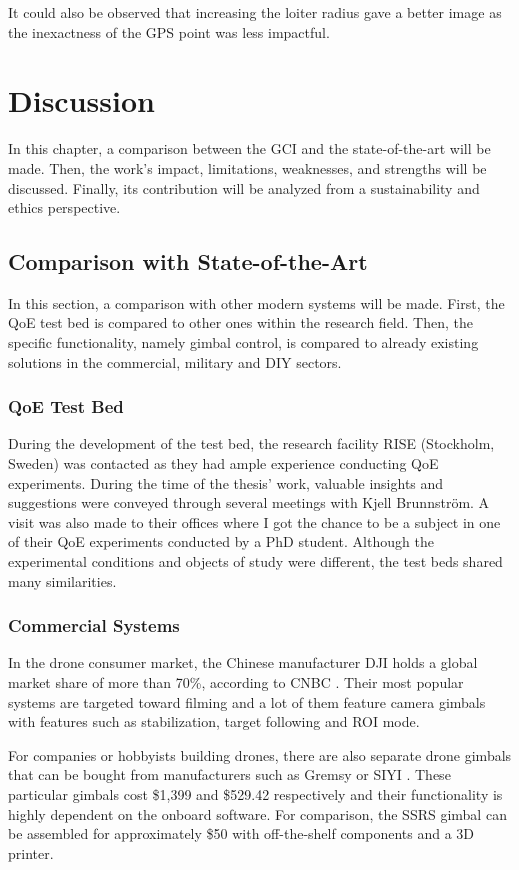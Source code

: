 \documentclass[nofilelist]{cslthse-msc}
\begin{document}
It could also be observed that increasing the loiter radius gave a better image as the inexactness of the GPS point was less impactful. 

\chapter{Discussion}
In this chapter, a comparison between the GCI and the state-of-the-art will be made. Then, the work's impact, limitations, weaknesses, and strengths will be discussed. Finally, its contribution will be analyzed from a sustainability and ethics perspective.

\section{Comparison with State-of-the-Art}
In this section, a comparison with other modern systems will be made. First, the QoE test bed is compared to other ones within the research field. Then, the specific functionality, namely gimbal control, is compared to already existing solutions in the commercial, military and DIY sectors.

\subsection{QoE Test Bed}
During the development of the test bed, the research facility RISE (Stockholm, Sweden) was contacted as they had ample experience conducting QoE experiments. During the time of the thesis' work, valuable insights and suggestions were conveyed through several meetings with Kjell Brunnström. A visit was also made to their offices where I got the chance to be a subject in one of their QoE experiments conducted by a PhD student. Although the experimental conditions and objects of study were different, the test beds shared many similarities. 

\subsection{Commercial Systems}
In the drone consumer market, the Chinese manufacturer DJI holds a global market share of more than 70\%, according to CNBC \cite{dji}. Their most popular systems are targeted toward filming and a lot of them feature camera gimbals with features such as stabilization, target following and ROI mode. 

For companies or hobbyists building drones, there are also separate drone gimbals that can be bought from manufacturers such as Gremsy \cite{gremsy} or SIYI \cite{siyi}. These particular gimbals cost \$1,399 and \$529.42 respectively and their functionality is highly dependent on the onboard software. For comparison, the SSRS gimbal can be assembled for approximately \$50 with off-the-shelf components and a 3D printer.
\end{document}
